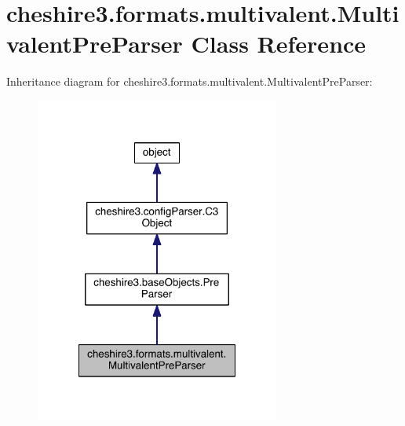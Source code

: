 \hypertarget{classcheshire3_1_1formats_1_1multivalent_1_1_multivalent_pre_parser}{\section{cheshire3.\-formats.\-multivalent.\-Multivalent\-Pre\-Parser Class Reference}
\label{classcheshire3_1_1formats_1_1multivalent_1_1_multivalent_pre_parser}
}


Inheritance diagram for cheshire3.\-formats.\-multivalent.\-Multivalent\-Pre\-Parser\-:
\nopagebreak
\begin{figure}[H]
\begin{center}
\leavevmode
\includegraphics[width=228pt]{classcheshire3_1_1formats_1_1multivalent_1_1_multivalent_pre_parser__inherit__graph}
\end{center}
\end{figure}


